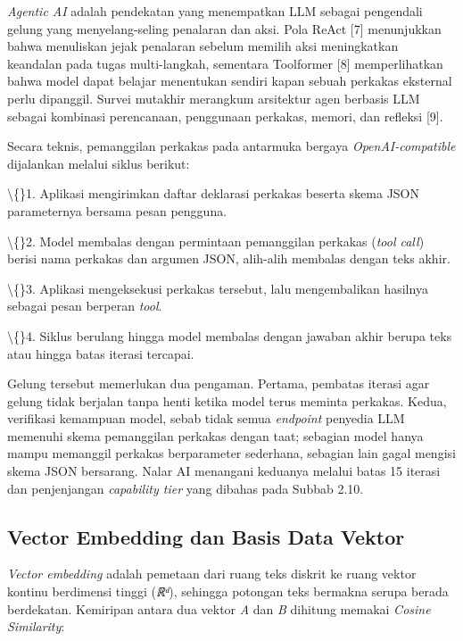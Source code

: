 \documentclass[12pt,a4paper]{article}
\begin{document}
\textit{Agentic AI} adalah pendekatan yang menempatkan LLM sebagai pengendali gelung yang menyelang-seling penalaran dan aksi. Pola ReAct {[}7{]} menunjukkan bahwa menuliskan jejak penalaran sebelum memilih aksi meningkatkan keandalan pada tugas multi-langkah, sementara Toolformer {[}8{]} memperlihatkan bahwa model dapat belajar menentukan sendiri kapan sebuah perkakas eksternal perlu dipanggil. Survei mutakhir merangkum arsitektur agen berbasis LLM sebagai kombinasi perencanaan, penggunaan perkakas, memori, dan refleksi {[}9{]}.



Secara teknis, pemanggilan perkakas pada antarmuka bergaya \textit{OpenAI-compatible} dijalankan melalui siklus berikut:



\textbackslash\{\}1. Aplikasi mengirimkan daftar deklarasi perkakas beserta skema JSON parameternya bersama pesan pengguna.



\textbackslash\{\}2. Model membalas dengan permintaan pemanggilan perkakas (\textit{tool call}) berisi nama perkakas dan argumen JSON, alih-alih membalas dengan teks akhir.



\textbackslash\{\}3. Aplikasi mengeksekusi perkakas tersebut, lalu mengembalikan hasilnya sebagai pesan berperan \textit{tool}.



\textbackslash\{\}4. Siklus berulang hingga model membalas dengan jawaban akhir berupa teks atau hingga batas iterasi tercapai.



Gelung tersebut memerlukan dua pengaman. Pertama, pembatas iterasi agar gelung tidak berjalan tanpa henti ketika model terus meminta perkakas. Kedua, verifikasi kemampuan model, sebab tidak semua \textit{endpoint} penyedia LLM memenuhi skema pemanggilan perkakas dengan taat; sebagian model hanya mampu memanggil perkakas berparameter sederhana, sebagian lain gagal mengisi skema JSON bersarang. Nalar AI menangani keduanya melalui batas 15 iterasi dan penjenjangan \textit{capability tier} yang dibahas pada Subbab 2.10.



\subsection*{Vector Embedding dan Basis Data Vektor}

\textit{Vector embedding} adalah pemetaan dari ruang teks diskrit ke ruang vektor kontinu berdimensi tinggi (\textit{ℝᵈ}), sehingga potongan teks bermakna serupa berada berdekatan. Kemiripan antara dua vektor \textit{A} dan \textit{B} dihitung memakai \textit{Cosine Similarity}:
\end{document}
